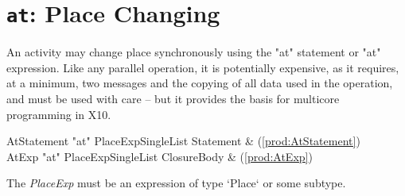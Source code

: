 \section{ {\tt at}: Place Changing}\label{AtStatement}

An activity may change place synchronously using the \xcd"at" statement or
\xcd"at" expression. Like any parallel operation, it is 
potentially expensive, as it requires, at a minimum, two messages
and the copying of all data used in the operation, and must be used with care
-- but it provides the basis for multicore programming in X10.

\begin{bbgrammar}
         AtStatement \: \xcd"at" PlaceExpSingleList Statement & (\ref{prod:AtStatement}) \\
               AtExp \: \xcd"at" PlaceExpSingleList ClosureBody & (\ref{prod:AtExp}) \\
\end{bbgrammar}

The {\it PlaceExp} must be an expression of type \xcd`Place` or some subtype.



